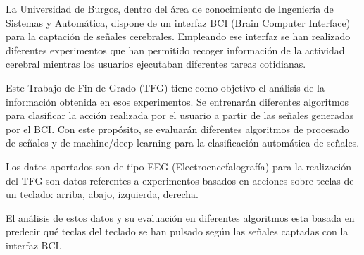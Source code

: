 
La Universidad de Burgos, dentro del área de conocimiento de Ingeniería de Sistemas y Automática, dispone de un interfaz BCI (Brain Computer Interface) para la captación de señales cerebrales. 
Empleando ese interfaz se han realizado diferentes experimentos que han permitido recoger información de la actividad cerebral mientras los usuarios ejecutaban diferentes tareas cotidianas. 

Este Trabajo de Fin de Grado (TFG) tiene como objetivo el análisis de la información obtenida en esos experimentos. Se entrenarán diferentes algoritmos para clasificar la acción realizada por el usuario a partir de las señales generadas por el BCI. Con este propósito, se evaluarán diferentes algoritmos de procesado de señales y de machine/deep learning para la clasificación automática de señales.

Los datos aportados son de tipo EEG (Electroencefalografía) para la realización del TFG son datos referentes a experimentos basados en acciones sobre teclas de un teclado: arriba, abajo, izquierda, derecha.

El análisis de estos datos y su evaluación en diferentes algoritmos esta basada en predecir qué teclas del teclado se han pulsado según las señales captadas con la interfaz BCI.


